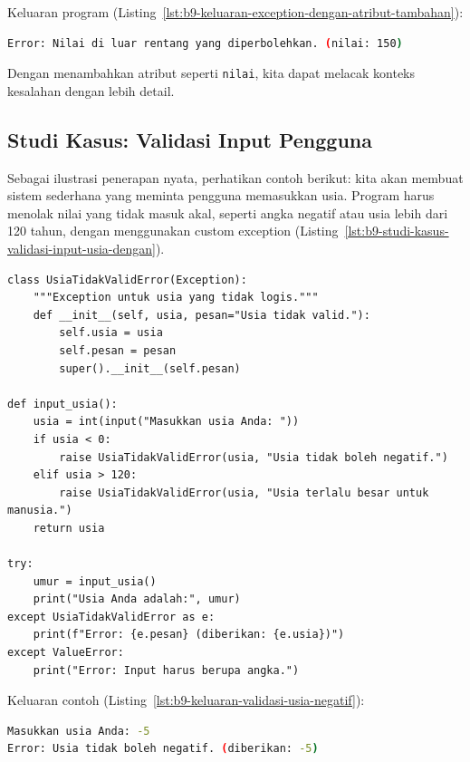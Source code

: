 Keluaran program (Listing~\ref{lst:b9-keluaran-exception-dengan-atribut-tambahan}):

\begin{lstlisting}[language=bash, caption={Keluaran exception dengan atribut tambahan}, label={lst:b9-keluaran-exception-dengan-atribut-tambahan}]
Error: Nilai di luar rentang yang diperbolehkan. (nilai: 150)
\end{lstlisting}

Dengan menambahkan atribut seperti \texttt{nilai}, kita dapat melacak konteks kesalahan dengan lebih detail.

\subsection*{Studi Kasus: Validasi Input Pengguna}

Sebagai ilustrasi penerapan nyata, perhatikan contoh berikut: kita akan membuat sistem sederhana yang meminta pengguna memasukkan usia. Program harus menolak nilai yang tidak masuk akal, seperti angka negatif atau usia lebih dari 120 tahun, dengan menggunakan custom exception (Listing~\ref{lst:b9-studi-kasus-validasi-input-usia-dengan}).

\begin{lstlisting}[style=PythonStyle, caption={Studi kasus: validasi input usia dengan custom exception}, label={lst:b9-studi-kasus-validasi-input-usia-dengan}]
class UsiaTidakValidError(Exception):
    """Exception untuk usia yang tidak logis."""
    def __init__(self, usia, pesan="Usia tidak valid."):
        self.usia = usia
        self.pesan = pesan
        super().__init__(self.pesan)

def input_usia():
    usia = int(input("Masukkan usia Anda: "))
    if usia < 0:
        raise UsiaTidakValidError(usia, "Usia tidak boleh negatif.")
    elif usia > 120:
        raise UsiaTidakValidError(usia, "Usia terlalu besar untuk manusia.")
    return usia

try:
    umur = input_usia()
    print("Usia Anda adalah:", umur)
except UsiaTidakValidError as e:
    print(f"Error: {e.pesan} (diberikan: {e.usia})")
except ValueError:
    print("Error: Input harus berupa angka.")
\end{lstlisting}

Keluaran contoh (Listing~\ref{lst:b9-keluaran-validasi-usia-negatif}):

\begin{lstlisting}[language=bash, caption={Keluaran validasi untuk usia negatif}, label={lst:b9-keluaran-validasi-usia-negatif}]
Masukkan usia Anda: -5
Error: Usia tidak boleh negatif. (diberikan: -5)
\end{lstlisting}

